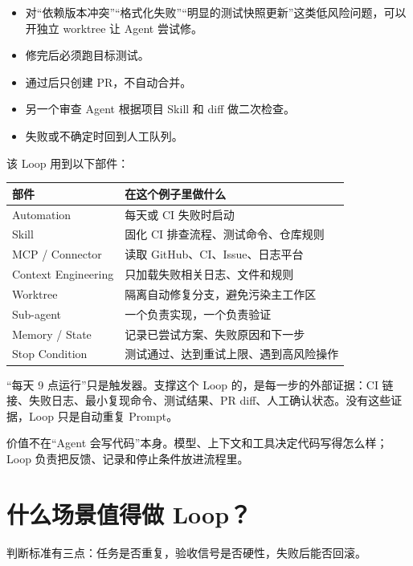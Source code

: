\documentclass[9pt,a4paper,twocolumn]{ctexart}
\begin{document}
\begin{itemize}[itemsep=1pt, topsep=2pt]
  \item 对“依赖版本冲突”“格式化失败”“明显的测试快照更新”这类低风险问题，可以开独立 worktree 让 Agent 尝试修。
  \item 修完后必须跑目标测试。
  \item 通过后只创建 PR，不自动合并。
  \item 另一个审查 Agent 根据项目 Skill 和 diff 做二次检查。
  \item 失败或不确定时回到人工队列。
\end{itemize}


该 Loop 用到以下部件：


{\footnotesize
\begin{tabular}{|p{}|p{}|}
\hline
\textbf{部件} & \textbf{在这个例子里做什么} \\
\hline
Automation & 每天或 CI 失败时启动 \\
\hline
Skill & 固化 CI 排查流程、测试命令、仓库规则 \\
\hline
MCP / Connector & 读取 GitHub、CI、Issue、日志平台 \\
\hline
Context Engineering & 只加载失败相关日志、文件和规则 \\
\hline
Worktree & 隔离自动修复分支，避免污染主工作区 \\
\hline
Sub-agent & 一个负责实现，一个负责验证 \\
\hline
Memory / State & 记录已尝试方案、失败原因和下一步 \\
\hline
Stop Condition & 测试通过、达到重试上限、遇到高风险操作 \\
\hline
\end{tabular}
}



“每天 9 点运行”只是触发器。支撑这个 Loop 的，是每一步的外部证据：CI 链接、失败日志、最小复现命令、测试结果、PR diff、人工确认状态。没有这些证据，Loop 只是自动重复 Prompt。



价值不在“Agent 会写代码”本身。模型、上下文和工具决定代码写得怎么样；Loop 负责把反馈、记录和停止条件放进流程里。



\section*{什么场景值得做 Loop？}


判断标准有三点：任务是否重复，验收信号是否硬性，失败后能否回滚。
\end{document}

